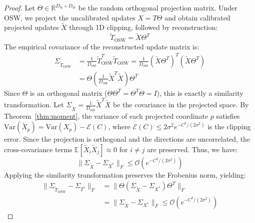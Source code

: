 \documentclass{article}
\theoremstyle{plain}
\theoremstyle{definition}
\theoremstyle{remark}
\begin{document}
\begin{proof}
Let $\Theta \in \mathbb{R}^{D_{\text{in}} \times D_{\text{in}}}$ be the random orthogonal projection matrix. Under OSW, we project the uncalibrated updates $X = T \Theta$ and obtain calibrated projected updates $\tilde{X}$ through 1D clipping, followed by reconstruction:
\begin{equation}
\tilde{T}_{\text{OSW}} = \tilde{X} \Theta^T
\end{equation}
The empirical covariance of the reconstructed update matrix is:
\begin{align}
\Sigma_{\tilde{T}_{\text{OSW}}} &= \frac{1}{D_{\text{out}}} \tilde{T}_{\text{OSW}}^T \tilde{T}_{\text{OSW}} = \frac{1}{D_{\text{out}}} (\tilde{X} \Theta^T)^T (\tilde{X} \Theta^T) \nonumber \\
&= \Theta \left( \frac{1}{D_{\text{out}}} \tilde{X}^T \tilde{X} \right) \Theta^T
\end{align}
Since $\Theta$ is an orthogonal matrix ($\Theta \Theta^T = \Theta^T \Theta = I$), this is exactly a similarity transformation. Let $\Sigma_{\tilde{X}} = \frac{1}{D_{\text{out}}} \tilde{X}^T \tilde{X}$ be the covariance in the projected space. By Theorem~\ref{thm:moment}, the variance of each projected coordinate $p$ satisfies $\text{Var}(\tilde{X}_p) = \text{Var}(X_p) - \mathcal{E}(C)$, where $\mathcal{E}(C) \le 2\sigma^2 e^{-C^2 / (2\sigma^2)}$ is the clipping error. Since the projection is orthogonal and the directions are uncorrelated, the cross-covariance terms $\mathbb{E}[\tilde{X}_i \tilde{X}_j] \approx 0$ for $i \ne j$ are preserved. Thus, we have:
\begin{equation}
\|\Sigma_{\tilde{X}} - \Sigma_{X^*}\|_F \le \mathcal{O}\left( e^{-C^2 / (2\sigma^2)} \right)
\end{equation}
Applying the similarity transformation preserves the Frobenius norm, yielding:
\begin{align}
\|\Sigma_{\tilde{T}_{\text{OSW}}} - \Sigma_{T^*}\|_F &= \|\Theta ( \Sigma_{\tilde{X}} - \Sigma_{X^*} ) \Theta^T\|_F \nonumber \\
&= \|\Sigma_{\tilde{X}} - \Sigma_{X^*}\|_F \le \mathcal{O}\left( e^{-C^2 / (2\sigma^2)} \right)
\end{align}


\end{proof}
\end{document}
